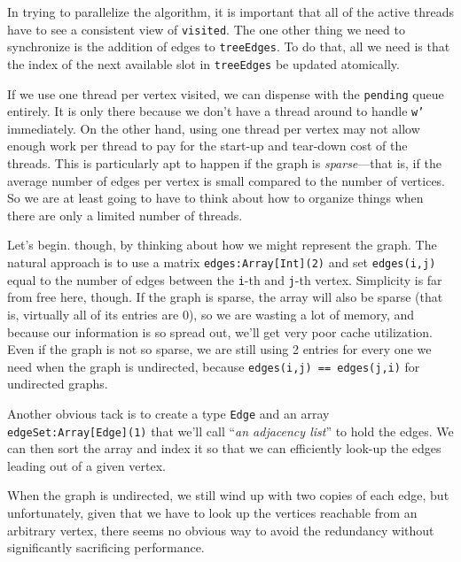 In trying to parallelize the algorithm, it is important that all of the
active threads have to see a consistent view of {\tt visited}.  The one other
thing we need to synchronize is the addition of edges to {\tt treeEdges}.  
To do that, all we need is that the index of the next available slot in
{\tt treeEdges} be updated atomically.  

If we use one thread per vertex visited, we can dispense
with the {\tt pending} queue entirely. It is only there because we don't have a
thread around to handle {\tt w'} immediately.  On the other hand, using one
thread per vertex may not allow enough work per thread to pay for the start-up
and tear-down cost of the threads.  This is particularly apt to happen if the
graph is {\em sparse}---that is, if the average number of edges per vertex is
small compared to the number of vertices.  So we are at least going to have to
think about how to organize things when there are only a limited number of
threads.

Let's begin. though, by thinking about how we might represent the graph.  The
natural approach is to use a matrix {\tt edges:Array[Int](2)} and set
{\tt edges(i,j)} equal to the number of edges between the {\tt i}-th and
{\tt j}-th vertex. Simplicity is far from free here, though.  If the graph is
sparse, the array will also be sparse (that is, virtually all of its entries
are 0), so we are wasting a lot of memory, and because our information is so
spread out, we'll get very poor cache utilization.  Even if the graph is not so
sparse, we are still using 2 entries for every one we need when the graph is
undirected, because {\tt edges(i,j) == edges(j,i)} for undirected graphs.

Another obvious tack is to create a type {\tt Edge} and an array
{\tt edgeSet:Array[Edge](1)} that we'll call ``{\em an adjacency list}'' to hold the
edges. We can then sort the array and index it so that we can efficiently
look-up the edges leading out of a given vertex.

When the graph is undirected, we still wind up with two copies of each edge,
but unfortunately, given that we have to look up the vertices reachable from an
arbitrary vertex, there seems no obvious way to avoid the redundancy without
significantly sacrificing performance.  

